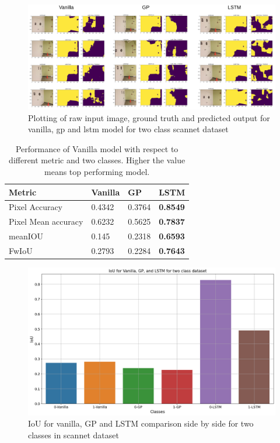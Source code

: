 	\begin{figure}[h]
		\centering
		\includegraphics[width=16cm]{images/output_unet_two_classes.png}
		\caption{Plotting of raw input image, ground truth and predicted output for vanilla, gp and lstm model for two class scannet dataset}
		\label{fig:output_vanilla}
	\end{figure}
	
	\begin{table}[h]
		\begin{center}
			\begin{tabular}{ | l | l | l | p{4cm} |}
				\hline
				
				\cellcolor{purple!30}Metric & \cellcolor{purple!30}Vanilla & \cellcolor{purple!30}GP & \cellcolor{purple!30}LSTM\\ \hline
				Pixel Accuracy & 0.4342 & 0.3764 & { \bf 0.8549 }\\ \hline
				Pixel Mean accuracy & 0.6232 & 0.5625 & { \bf 0.7837 }  \\ \hline
				meanIOU & 0.145 & 0.2318 & { \bf 0.6593 }  \\ \hline
				FwIoU & 0.2793 & 0.2284 & { \bf 0.7643 } \\ \hline
				\hline
			\end{tabular}
			\caption{Performance of Vanilla model with respect to different metric and two classes. Higher the value means top performing model.}
			\label{table:unet_two_classes}
		\end{center}
	\end{table}

	\begin{figure}
		\centering
		\includegraphics[width=12cm]{images/iou_vanilla_gp_lstm_two_classes.png}
		\caption{IoU for vanilla, GP and LSTM comparison side by side for two classes in scannet dataset}
		\label{fig:unet_model_metric_comparison}
	\end{figure}
	
